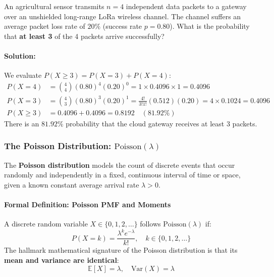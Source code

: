 \begin{example}
An agricultural sensor transmits $n = 4$ independent data packets to a gateway over an unshielded long-range LoRa wireless channel. The channel suffers an average packet loss rate of $20\%$ (success rate $p = 0.80$).
What is the probability that \textbf{at least 3} of the 4 packets arrive successfully?

\paragraph{Solution:}
We evaluate $P(X \ge 3) = P(X = 3) + P(X = 4)$:
\begin{align*}
P(X = 4) &= \binom{4}{4} (0.80)^4 (0.20)^0 = 1 \times 0.4096 \times 1 = \mathbf{0.4096} \\
P(X = 3) &= \binom{4}{3} (0.80)^3 (0.20)^1 = \frac{4!}{3!1!} (0.512)(0.20) = 4 \times 0.1024 = \mathbf{0.4096} \\
P(X \ge 3) &= 0.4096 + 0.4096 = \mathbf{0.8192} \quad (81.92\%)
\end{align*}
There is an $81.92\%$ probability that the cloud gateway receives at least 3 packets.
\end{example}

\subsubsection{The Poisson Distribution: $\text{Poisson}(\lambda)$}
The \textbf{Poisson distribution} models the count of discrete events that occur randomly and independently in a fixed, continuous interval of time or space, given a known constant average arrival rate $\lambda > 0$.

\paragraph{Formal Definition: Poisson PMF and Moments}

A discrete random variable $X \in \{0, 1, 2, \dots\}$ follows $\text{Poisson}(\lambda)$ if:
\begin{equation}
P(X = k) = \frac{\lambda^k e^{-\lambda}}{k!}, \quad k \in \{0, 1, 2, \dots\}\label{eq:poisson_pmf}
\end{equation}
The hallmark mathematical signature of the Poisson distribution is that its \textbf{mean and variance are identical}:
\begin{equation}
\mathbb{E}[X] = \lambda, \quad \text{Var}(X) = \lambda\label{eq:poisson_moments}
\end{equation}


